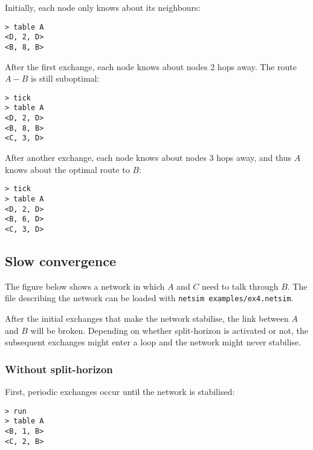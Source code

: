 \documentclass{scrartcl}
\begin{document}
Initially, each node only knows about its neighbours:

\begin{verbatim}
> table A
<D, 2, D>
<B, 8, B>
\end{verbatim}

After the first exchange, each node knows about nodes 2 hops away. The route
$A - B$ is still suboptimal:

\begin{verbatim}
> tick
> table A
<D, 2, D>
<B, 8, B>
<C, 3, D>
\end{verbatim}

After another exchange, each node knows about nodes 3 hops away, and thus $A$
knows about the optimal route to $B$:

\begin{verbatim}
> tick
> table A
<D, 2, D>
<B, 6, D>
<C, 3, D>
\end{verbatim}

\subsection{Slow convergence}

The figure below shows a network in which $A$ and $C$ need to talk through $B$.
The file describing the network can be loaded with \texttt{netsim
examples/ex4.netsim}.

After the initial exchanges that make the network stabilise, the link between
$A$ and $B$ will be broken. Depending on whether split-horizon is activated or
not, the subsequent exchanges might enter a loop and the network might never
stabilise.

\begin{figure}[h!]
\end{figure}

\subsubsection{Without split-horizon}

First, periodic exchanges occur until the network is stabilised:

\begin{verbatim}
> run
> table A
<B, 1, B>
<C, 2, B>
\end{verbatim}
\end{document}
